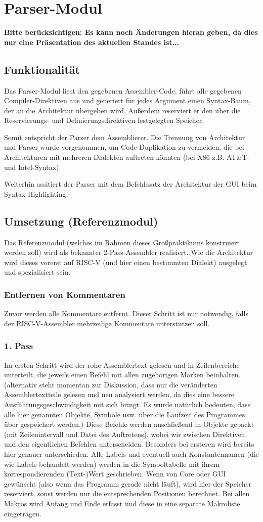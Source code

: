 \documentclass[a4paper]{article}
\begin{document}
\section{Parser-Modul}
\textbf{Bitte berücksichtigen: Es kann noch Änderungen hieran geben, da dies nur eine Präsentation des aktuellen Standes ist...}
\subsection{Funktionalität}
Das Parser-Modul liest den gegebenen Assembler-Code,
führt alle gegebenen Compiler-Direktiven aus und generiert für jedes Argument einen Syntax-Baum,
der an die Architektur übergeben wird.
Außerdem reserviert er den über die Reservierungs- und Definierungsdirektiven festgelegten Speicher.

Somit entspricht der Parser dem Assemblierer.
Die Trennung von Architektur und Parser wurde vorgenommen,
um Code-Duplikation zu vermeiden,
die bei Architekturen mit mehreren Dialekten auftreten könnten (bei X86 z.B. AT\&T- und Intel-Syntax).

Weiterhin assitiert der Parser mit dem Befehlssatz der Architektur der GUI beim Syntax-Highlighting.
\subsection{Umsetzung (Referenzmodul)}
Das Referenzmodul (welches im Rahmen dieses Großpraktikums konstruiert werden soll) wird als bekannter 2-Pass-Assembler realisiert. Wie die Architektur wird dieses vorerst auf RISC-V (und hier einen bestimmten Dialekt) ausgelegt und spezialisiert sein.
\subsubsection{Entfernen von Kommentaren}
Zuvor werden alle Kommentare entfernt. Dieser Schritt ist nur notwendig, falls der RISC-V-Assembler mehrzeilige Kommentare unterstützen soll.
\subsubsection{1. Pass}
Im ersten Schritt wird der rohe Assemblertext gelesen und in Zeilenbereiche unterteilt, die jeweils einen Befehl mit allen zugehörigen Marken beinhalten.
(alternativ steht momentan zur Diskussion, dass nur die veränderten Assemblertextteile gelesen und neu analysiert werden, da dies eine bessere Ausführungsgeschwindigkeit mit sich bringt.
Es würde natürlich bedeuten, dass alle hier genannten Objekte, Symbole usw. über die Laufzeit des Programmes über gespeichert werden.)
Diese Befehle werden anschließend in Objekte gepackt (mit Zeilenintervall und Datei des Auftretens), wobei wir zwischen Direktiven und den eigentlichen Befehlen unterscheiden.
Besonders bei ersteren wird bereits hier genauer unterschieden.
Alle Labels und eventuell auch Konstantennamen (die wie Labels behandelt werden) werden in die Symboltabelle mit ihrem korrespondierenden (Text-)Wert geschrieben.
Wenn von Core oder GUI gewünscht (also wenn das Programm gerade nicht läuft), wird hier der Speicher reserviert, sonst werden nur die entsprechenden Positionen berechnet.
Bei allen Makros wird Anfang und Ende erfasst und diese in eine separate Makroliste eingetragen.
\end{document}
